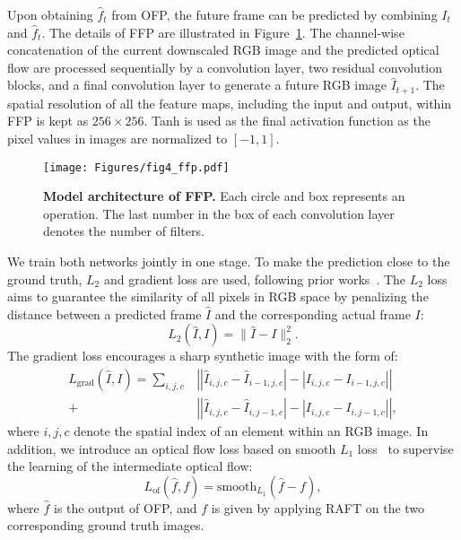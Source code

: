 Upon obtaining $\hat{f}_t$ from OFP, the future frame can be predicted by combining $I_t$ and $\hat{f}_t$. The details of FFP are illustrated in Figure~\ref{fig:ffp}. The channel-wise concatenation of the current downscaled RGB image and the predicted optical flow are processed sequentially by a convolution layer, two residual convolution blocks, and a final convolution layer to generate a future RGB image $\hat{I}_{t+1}$. The spatial resolution of all the feature maps, including the input and output, within FFP is kept as $256 \times 256$. Tanh is used as the final activation function as the pixel values in images are normalized to $[-1, 1]$.

\begin{figure}[t]
  \centering
  \texttt{[image: Figures/fig4\_ffp.pdf]}
  \caption{\textbf{Model architecture of FFP.} Each circle and box represents an operation. The last number in the box of each convolution layer denotes the number of filters.}
  \label{fig:ffp}
\end{figure}

We train both networks jointly in one stage. To make the prediction close to the ground truth, $L_2$ and gradient loss are used, following prior works~\citep{liu2018future}. The $L_2$ loss aims to guarantee the similarity of all pixels in RGB space by penalizing the distance between a predicted frame $\hat{I}$ and the corresponding actual frame $I$:
\begin{equation}
L_2(\hat{I}, I) = \| \hat{I} - I \|_2^2.
\end{equation}
The gradient loss encourages a sharp synthetic image with the form of:
\begin{equation}
\begin{aligned}
L_\text{grad}(\hat{I}, I) = \sum_{i,j,c} &\left|| \hat{I}_{i,j,c} - \hat{I}_{i-1,j,c} | - | I_{i,j,c} - I_{i-1,j,c} |\right| \\
+
&\left|| \hat{I}_{i,j,c} - \hat{I}_{i,j-1,c} | - | I_{i,j,c} - I_{i,j-1,c} |\right|,
\end{aligned}
\end{equation}
where $i,j,c$ denote the spatial index of an element within an RGB image. In addition, we introduce an optical flow loss based on smooth $L_1$ loss~\citep{girshick2015fast} to supervise the learning of the intermediate optical flow:
\begin{equation}
L_\text{of} (\hat{f}, f) = \text{smooth}_{L_1} (\hat{f} - f),
\end{equation}
where $\hat{f}$ is the output of OFP, and $f$ is given by applying RAFT on the two corresponding ground truth images.

